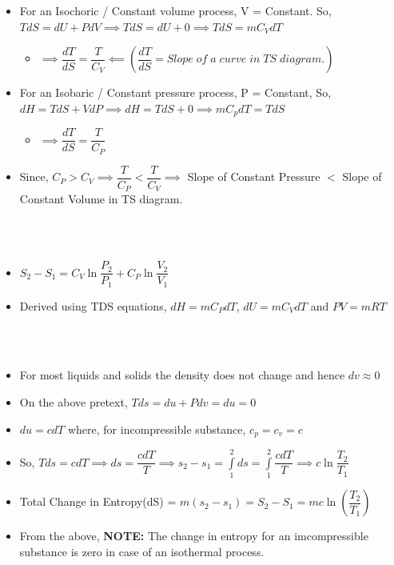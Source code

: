 \documentclass[8pt]{article}
\begin{document}
	\begin{itemize}
		\item For an Isochoric / Constant volume process, V = Constant. So, $TdS = dU + PdV \implies TdS = dU + 0 \implies TdS = mC_VdT$
			\begin{itemize}
				\item[] $\implies \boxed{\dfrac{dT}{dS}=\dfrac{T}{C_V}} \impliedby \left(\dfrac{dT}{dS} = Slope\;of\;a\;curve\;in\;TS\;diagram. \right)$
			\end{itemize}
		\item For an Isobaric / Constant pressure process, P = Constant, So, $dH = TdS + VdP \implies dH = TdS + 0 \implies mC_pdT = TdS$
			\begin{itemize}
				\item[] $\implies \boxed{\dfrac{dT}{dS} = \dfrac{T}{C_P}}$
			\end{itemize}
		\item Since, $C_P > C_V \implies \boxed{\dfrac{T}{C_P} < \dfrac{T}{C_V}} \implies$ Slope of Constant Pressure $<$ Slope of Constant Volume in TS diagram. 
	\end{itemize}
	\hrulefill\\
\\
	\begin{itemize}
		\item $\boxed{S_2-S_1 = C_V\ln\dfrac{P_2}{P_1}+C_P\ln\dfrac{V_2}{V_1}}$
		\item Derived using TDS equations, $dH = mC_PdT$, $dU = mC_VdT$ and $PV = mRT$
	\end{itemize}\hrulefill\\
\\
	\begin{itemize}
		\item For most liquids and solids the density does not change and hence $dv \approx 0$
		\item On the above pretext, $Tds = du + Pdv = du = 0$
		\item $du = cdT$ where, for incompressible substance, $c_p = c_v = c$
		\item So, $\boxed{Tds = cdT} \implies ds = \dfrac{cdT}{T} \implies s_2-s_1 = \int\limits_1^2ds = \int\limits_1^2\dfrac{cdT}{T} \implies c\ln\dfrac{T_2}{T_1}$
		\item Total Change in Entropy(dS) = $m(s_2-s_1) = \boxed{S_2-S_1 = mc\ln\left(\dfrac{T_2}{T_1}\right)}$
		\item From the above, \textbf{NOTE: }The change in entropy for an imcompressible substance is zero in case of an isothermal process.  
	\end{itemize}\hrulefill\\
\end{document}
